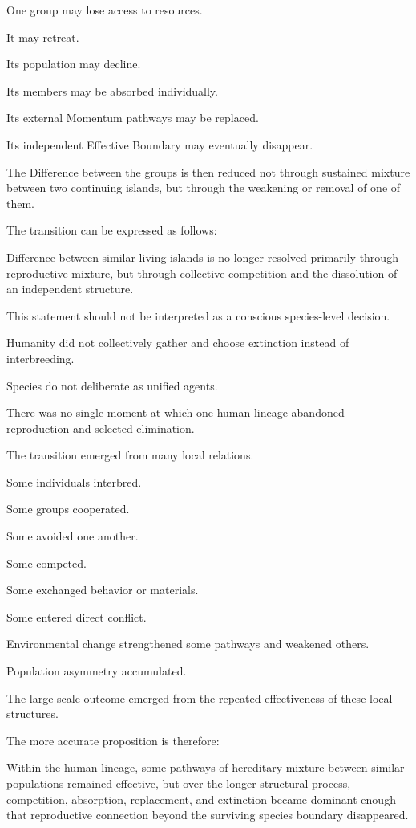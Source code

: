 One group may lose access to resources.

It may retreat.

Its population may decline.

Its members may be absorbed individually.

Its external Momentum pathways may be replaced.

Its independent Effective Boundary may eventually disappear.

The Difference between the groups is then reduced not through sustained mixture between two continuing islands, but through the weakening or removal of one of them.

The transition can be expressed as follows:

Difference between similar living islands is no longer resolved primarily through reproductive mixture, but through collective competition and the dissolution of an independent structure.

This statement should not be interpreted as a conscious species-level decision.

Humanity did not collectively gather and choose extinction instead of interbreeding.

Species do not deliberate as unified agents.

There was no single moment at which one human lineage abandoned reproduction and selected elimination.

The transition emerged from many local relations.

Some individuals interbred.

Some groups cooperated.

Some avoided one another.

Some competed.

Some exchanged behavior or materials.

Some entered direct conflict.

Environmental change strengthened some pathways and weakened others.

Population asymmetry accumulated.

The large-scale outcome emerged from the repeated effectiveness of these local structures.

The more accurate proposition is therefore:

Within the human lineage, some pathways of hereditary mixture between similar populations remained effective, but over the longer structural process, competition, absorption, replacement, and extinction became dominant enough that reproductive connection beyond the surviving species boundary disappeared.

